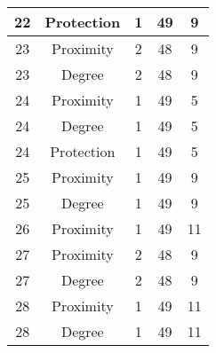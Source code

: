 \documentclass[results.tex]{subfiles}
\begin{document}
\begin{center}
\begin{tabular}{| c || c | c | c | c |}
            \hline
            22                      & Protection                   & 1                      & 49                      & 9                    \\
            \hline
            23                      & Proximity                    & 2                      & 48                      & 9                    \\
            \hline
            23                      & Degree                       & 2                      & 48                      & 9                    \\
            \hline
            24                      & Proximity                    & 1                      & 49                      & 5                    \\
            \hline
            24                      & Degree                       & 1                      & 49                      & 5                    \\
            \hline
            24                      & Protection                   & 1                      & 49                      & 5                    \\
            \hline
            25                      & Proximity                    & 1                      & 49                      & 9                    \\
            \hline
            25                      & Degree                       & 1                      & 49                      & 9                    \\
            \hline
            26                      & Proximity                    & 1                      & 49                      & 11                   \\
            \hline
            27                      & Proximity                    & 2                      & 48                      & 9                    \\
            \hline
            27                      & Degree                       & 2                      & 48                      & 9                    \\
            \hline
            28                      & Proximity                    & 1                      & 49                      & 11                   \\
            \hline
            28                      & Degree                       & 1                      & 49                      & 11                   \\

\end{tabular}
\end{center}
\end{document}
